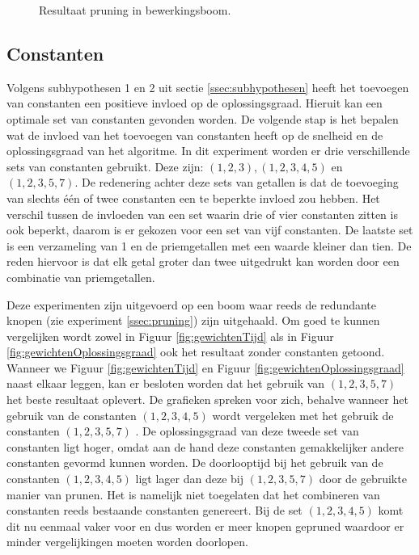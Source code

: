 \documentclass[Main.tex]{subfiles}
\begin{document}
\begin{figure}[!htb]
\centering
{}
\caption{Resultaat pruning in bewerkingsboom.} \label{fig:pruningInBewerkingsboom}
\end{figure}

\subsection{Constanten} \label{ssec:constanten}
Volgens subhypothesen 1 en 2 uit sectie \ref{ssec:subhypothesen} heeft het toevoegen van constanten een positieve invloed op de oplossingsgraad. Hieruit kan een optimale set van constanten gevonden worden.
De volgende stap is het bepalen wat de invloed van het toevoegen van constanten heeft op de snelheid en de oplossingsgraad van het algoritme. In dit experiment worden er drie verschillende sets van constanten gebruikt. Deze zijn: $(1,2,3), (1,2,3,4,5)$ en $(1,2,3,5,7)$. De redenering achter deze sets van getallen is dat de toevoeging van slechts \'e\'en of twee constanten een te beperkte invloed zou hebben. Het verschil tussen de invloeden van een set waarin drie of vier constanten zitten is ook beperkt, daarom is er gekozen voor een set van vijf constanten. De laatste set is een verzameling van 1 en de priemgetallen met een waarde kleiner dan tien. De reden hiervoor is dat elk getal groter dan twee uitgedrukt kan worden door een combinatie van priemgetallen.
\par Deze experimenten zijn uitgevoerd op een boom waar reeds de redundante knopen (zie experiment \ref{ssec:pruning}) zijn uitgehaald. Om goed te kunnen vergelijken wordt zowel in Figuur \ref{fig:gewichtenTijd} als in Figuur \ref{fig:gewichtenOplossingsgraad} ook het resultaat zonder constanten getoond. Wanneer we Figuur \ref{fig:gewichtenTijd} en Figuur \ref{fig:gewichtenOplossingsgraad} naast elkaar leggen, kan er besloten worden dat het gebruik van $(1,2,3,5,7)$ het beste resultaat oplevert. De grafieken spreken voor zich, behalve wanneer het gebruik van de constanten $(1, 2, 3, 4, 5)$  wordt vergeleken met het gebruik de constanten $(1, 2, 3, 5, 7)$ . De oplossingsgraad van deze tweede set van constanten ligt hoger, omdat aan de hand deze constanten gemakkelijker andere constanten gevormd kunnen worden. De doorlooptijd bij het gebruik van de constanten $(1, 2, 3, 4, 5)$ ligt lager dan deze bij $(1,2,3,5,7)$ door de gebruikte manier van prunen. Het is namelijk niet toegelaten dat het combineren van constanten reeds bestaande constanten genereert. Bij de set $(1, 2, 3, 4, 5)$ komt dit nu eenmaal vaker voor en dus worden er meer knopen gepruned waardoor er minder vergelijkingen moeten worden doorlopen.
\end{document}
